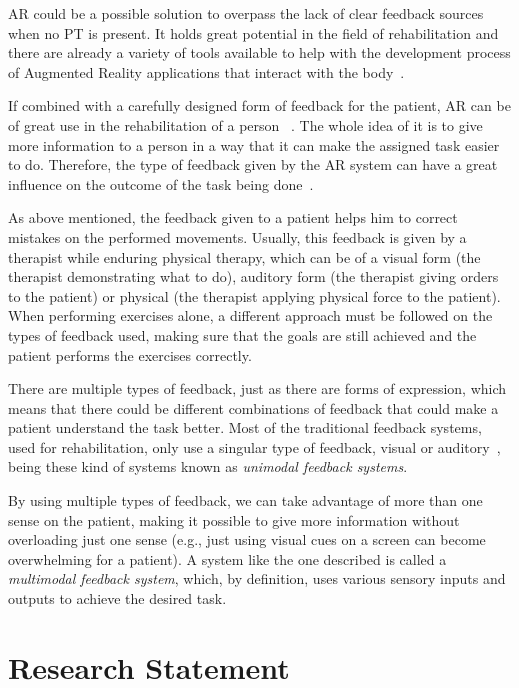 \ac{AR} could be a possible solution to overpass the lack of clear feedback sources when no \ac{PT} is present.
It holds great potential in the field of rehabilitation %
and there are already a variety of tools available to help with the development process of Augmented
Reality applications that interact with the body~\cite{Gama2012a}.

If combined with a carefully designed form of feedback for the patient,
\ac{AR} can be of great use in the rehabilitation of a person ~\cite{Sigrist2013}. 
The whole idea of it is to give more information to a person in a way that it can make the assigned task easier to do.
Therefore, the type of feedback given by the \ac{AR} system can have a great influence 
on the outcome of the task being done~\cite{Causo2011}.

As above mentioned, the feedback given to a patient helps him to correct mistakes on the performed movements.
Usually, this feedback is given by a therapist while enduring physical therapy, which can be of a visual form (the therapist demonstrating what to do), auditory form (the therapist giving orders to the patient) or physical (the therapist applying physical force to the patient). 
When performing exercises alone, a different approach must be followed on the types of feedback used, making sure that the goals 
are still achieved and the patient performs the exercises correctly.

There are multiple types of feedback, just as there are forms of expression, which means that 
there could be different combinations of feedback that could make a patient understand the task better.
Most of the traditional feedback systems, used for rehabilitation, only use a singular type of feedback,
visual or auditory~\cite{Design2005}, being these kind of systems known as \emph{unimodal feedback systems}.

By using multiple types of feedback, we can take advantage of more than one sense on the patient, 
making it possible to give more information without overloading just one sense (e.g., just using visual
cues on a screen can become overwhelming for a patient). A system like the one described is called a 
\emph{multimodal feedback system}, which, by definition, uses various sensory inputs and outputs to achieve the desired task.

\section{Research Statement}

